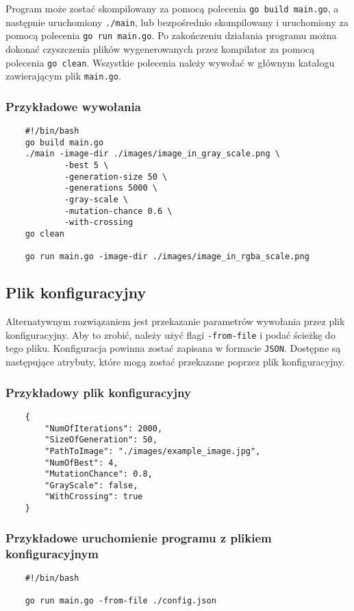 Program może zostać skompilowany za pomocą polecenia \texttt{go build main.go}, a następnie uruchomiony \texttt{./main}, lub bezpośrednio skompilowany i uruchomiony za pomocą polecenia \texttt{go run main.go}. Po zakończeniu działania programu można dokonać czyszczenia plików wygenerowanych przez kompilator za pomocą polecenia \texttt{go clean}. Wszystkie polecenia należy wywołać w głównym katalogu zawierającym plik \texttt{main.go}. 

\subsubsection{Przykładowe wywołania}
\begin{verbatim}
    #!/bin/bash
    go build main.go
    ./main -image-dir ./images/image_in_gray_scale.png \
            -best 5 \
            -generation-size 50 \
            -generations 5000 \
            -gray-scale \
            -mutation-chance 0.6 \
            -with-crossing 
    go clean
    
    go run main.go -image-dir ./images/image_in_rgba_scale.png
\end{verbatim}

\subsection{Plik konfiguracyjny}
Alternatywnym rozwiązaniem jest przekazanie parametrów wywołania przez plik konfiguracyjny. Aby to zrobić, należy użyć flagi \texttt{-from-file} i podać ścieżkę do tego pliku. Konfiguracja powinna zostać zapisana w formacie \texttt{JSON}. Dostępne są następujące atrybuty, które mogą zostać przekazane poprzez plik konfiguracyjny.

\subsubsection{Przykładowy plik konfiguracyjny}
\begin{verbatim}
    {
        "NumOfIterations": 2000,
        "SizeOfGeneration": 50,
        "PathToImage": "./images/example_image.jpg",
        "NumOfBest": 4,
        "MutationChance": 0.8,
        "GrayScale": false,
        "WithCrossing": true
    }
\end{verbatim}

\subsubsection{Przykładowe uruchomienie programu z plikiem konfiguracyjnym}
\begin{verbatim}
    #!/bin/bash
    
    go run main.go -from-file ./config.json
\end{verbatim}

